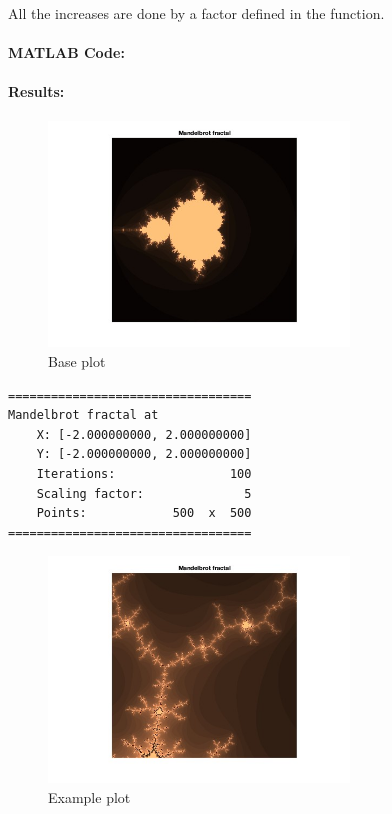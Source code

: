 All the increases are done by a factor defined in the  function.

\paragraph{MATLAB Code:}

\begin{tiny}
    
\end{tiny}

\paragraph{Results:}

\begin{figure}[H]
    \centering
    \includegraphics[width=8cm]{figures/base}
    \caption{Base plot}
\end{figure}
\begin{verbatim}
==================================
Mandelbrot fractal at
    X: [-2.000000000, 2.000000000]
    Y: [-2.000000000, 2.000000000]
    Iterations:                100
    Scaling factor:              5
    Points:            500  x  500
==================================
\end{verbatim}

\begin{figure}[H]
    \centering
    \includegraphics[width=8cm]{figures/main}
    \caption{Example plot}
\end{figure}

